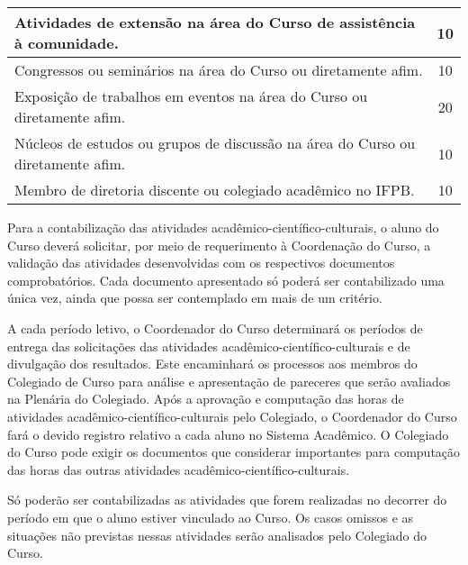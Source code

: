 \begin{table}[h]
\begin{tabular}{|l|c|}
Atividades de extensão na área do Curso de assistência à comunidade.                              & 10                                                                                         \\ \hline
Congressos ou seminários na área do Curso ou diretamente afim.                                    & 10                                                                                         \\ \hline
Exposição de trabalhos em eventos na área do Curso ou diretamente afim.                           & 20                                                                                         \\ \hline
Núcleos de estudos ou grupos de discussão na área do Curso ou diretamente afim.                   & 10                                                                                         \\ \hline
Membro de diretoria discente ou colegiado acadêmico no IFPB.                                      & 10                                                                                         \\ \hline
\end{tabular}
\end{table}

Para a contabilização das atividades acadêmico-científico-culturais, o aluno do Curso deverá solicitar, por meio de requerimento à Coordenação do Curso, a validação das atividades desenvolvidas com os respectivos documentos comprobatórios. Cada documento apresentado só poderá ser contabilizado uma única vez, ainda que possa ser contemplado em mais de um critério.

A cada período letivo, o Coordenador do Curso determinará os períodos de entrega das solicitações das atividades acadêmico-científico-culturais e de divulgação dos resultados. Este encaminhará os processos aos membros do Colegiado de Curso para análise e apresentação de pareceres que serão avaliados na Plenária do Colegiado. Após a aprovação e computação das horas de atividades acadêmico-científico-culturais pelo Colegiado, o Coordenador do Curso fará o devido registro relativo a cada aluno no Sistema Acadêmico. O Colegiado do Curso pode exigir os documentos que considerar importantes para computação das horas das outras atividades acadêmico-científico-culturais.

Só poderão ser contabilizadas as atividades que forem realizadas no decorrer do período em que o aluno estiver vinculado ao Curso. Os casos omissos e as situações não previstas nessas atividades serão analisados pelo Colegiado do Curso.

